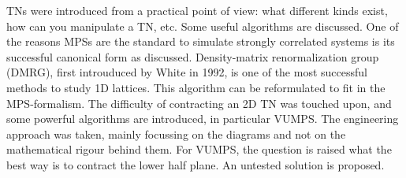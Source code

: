 \Glspl{TN} were introduced from a practical point of view: what different kinds exist, how can you manipulate a \Gls{TN}, etc. Some useful algorithms are discussed. One of the reasons \Glspl{MPS} are the standard to simulate strongly correlated systems is its successful canonical form as discussed.  Density-matrix renormalization group (DMRG), first introuduced by White in 1992, is one of the most successful methods to study 1D lattices. This algorithm can be reformulated to fit in the \Gls{MPS}-formalism. \cite{Schollwock2011} The difficulty of contracting an 2D \Gls{TN} was touched upon, and some powerful algorithms are introduced, in particular VUMPS. The engineering approach was taken, mainly focussing on the diagrams and not on the mathematical rigour behind them. For \Gls{VUMPS}, the question is raised what the best way is to contract the lower half plane. An untested solution is proposed.